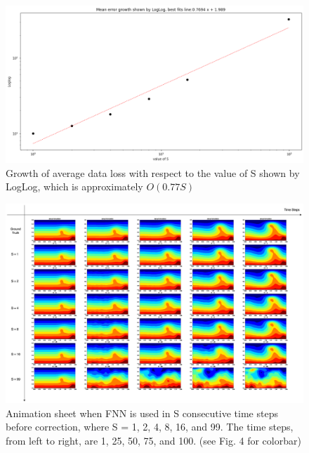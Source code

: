 {\begin{figure}[H]
    \centering
    \includegraphics[width=0.7\linewidth]{figures/FNN_LogLog.png}
    \caption{Growth of average data loss with respect to the value of S shown by LogLog, which is approximately $O(0.77S)$}
\end{figure}

\begin{figure}[H]
    \centering
    \includegraphics[width=0.9\linewidth]{figures/FNN_further_testing_sheet.png}
    \caption{Animation sheet when FNN is used in S consecutive time steps before correction, where S = 1, 2, 4, 8, 16, and 99. The time steps, from left to right, are 1, 25, 50, 75, and 100. (see Fig. 4 for colorbar)}
\end{figure}
}

